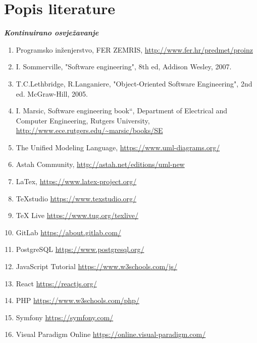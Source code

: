 \chapter*{Popis literature}
	 	
 		\textbf{\textit{Kontinuirano osvježavanje}}
	
		
		
		\begin{enumerate}
			
			
			\item  Programsko inženjerstvo, FER ZEMRIS, \url{http://www.fer.hr/predmet/proinz}
			
			\item  I. Sommerville, "Software engineering", 8th ed, Addison Wesley, 2007.
			
			\item  T.C.Lethbridge, R.Langaniere, "Object-Oriented Software Engineering", 2nd ed. McGraw-Hill, 2005.
			
			\item  I. Marsic, Software engineering book``, Department of Electrical and Computer Engineering, Rutgers University, \url{http://www.ece.rutgers.edu/~marsic/books/SE}
			
			\item  The Unified Modeling Language, \url{https://www.uml-diagrams.org/}
			
			\item  Astah Community, \url{http://astah.net/editions/uml-new}
			
			\item  LaTex, \url{https://www.latex-project.org/}
			
			\item  TeXstudio \url{https://www.texstudio.org/}
			
			
			\item TeX Live \url{https://www.tug.org/texlive/}
			
			\item GitLab \url{https://about.gitlab.com/}
			
			\item PostgreSQL \url{https://www.postgresql.org/}
			
			\item JavaScript Tutorial \url{https://www.w3schools.com/js/}
			
			\item React \url{https://reactjs.org/}
			
			\item PHP \url{https://www.w3schools.com/php/}
			
			\item Symfony \url{https://symfony.com/}
			
			\item Visual Paradigm Online \url{https://online.visual-paradigm.com/}
			
		\end{enumerate}
		
		 